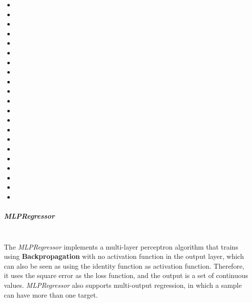 \begin{itemize}
  \item {}
  \item {}
  \item {}
  \item {}
  \item {}
  \item {}
  \item {}
  \item {}
  \item {}
  \item {}
  \item {}
  \item {}
  \item {}
  \item {}
  \item {}
  \item {}
  \item {}
  \item {}
  \item {}
  \item {}
  \item {}
\end{itemize}

\subparagraph{MLPRegressor}
\mbox{}
\\The \textit{MLPRegressor} implements a multi-layer perceptron algorithm that trains using \textbf{Backpropagation} with
no activation function in the output layer, which can also be seen as using the identity function as activation function.
Therefore, it uses the square error as the loss function, and the output is a set of continuous values.
\textit{MLPRegressor} also supports multi-output regression, in which a sample can have more than one target.

